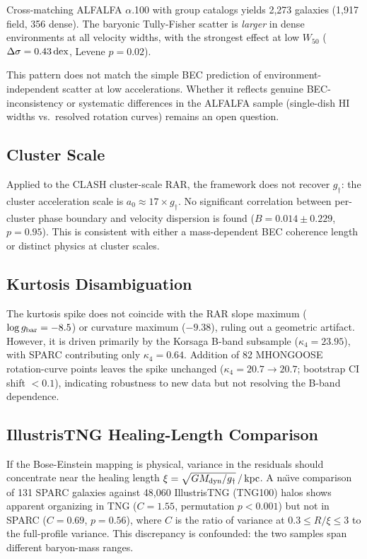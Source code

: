 \documentclass[twocolumn,twocolappendix]{aastex631}
\newcommand{\gbar}{g_{\rm bar}}
\newcommand{\gdag}{g_{\dagger}}
\newcommand{\dex}{\,{\rm dex}}
\begin{document}
Cross-matching ALFALFA $\alpha$.100 with \citet{Yang2007} group catalogs
yields 2{,}273 galaxies (1{,}917 field, 356 dense). The baryonic
Tully-Fisher scatter is \emph{larger} in dense environments at all velocity
widths, with the strongest effect at low $W_{50}$
($\Delta\sigma = 0.43\dex$, Levene $p = 0.02$).

This pattern does not match the simple BEC prediction of
environment-independent scatter at low accelerations. Whether it reflects
genuine BEC-inconsistency or systematic differences in the ALFALFA sample
(single-dish HI widths vs.\ resolved rotation curves) remains an open
question.

\subsection{Cluster Scale} \label{sec:clusters}

Applied to the \citet{Tian2020} CLASH cluster-scale RAR, the framework does
not recover $\gdag$: the cluster acceleration scale is
$a_0 \approx 17 \times \gdag$. No significant correlation between
per-cluster phase boundary and velocity dispersion is found
($B = 0.014 \pm 0.229$, $p = 0.95$). This is consistent with either a
mass-dependent BEC coherence length or distinct physics at cluster scales.

\subsection{Kurtosis Disambiguation} \label{sec:kurtosis_disambig}

The kurtosis spike does not coincide with the RAR slope maximum
($\log\gbar = -8.5$) or curvature maximum ($-9.38$), ruling out a
geometric artifact. However, it is driven primarily by the Korsaga B-band
subsample ($\kappa_4 = 23.95$), with SPARC contributing only
$\kappa_4 = 0.64$. Addition of 82 MHONGOOSE rotation-curve points leaves
the spike unchanged ($\kappa_4 = 20.7 \to 20.7$; bootstrap CI shift
$< 0.1$), indicating robustness to new data but not resolving the B-band
dependence.

\subsection{IllustrisTNG Healing-Length Comparison} \label{sec:tng_xi}

If the Bose-Einstein mapping is physical, variance in the residuals should
concentrate near the healing length $\xi = \sqrt{G M_{\rm dyn}/\gdag}\,/\,
{\rm kpc}$. A na\"{\i}ve comparison of 131 SPARC galaxies against 48{,}060
IllustrisTNG (TNG100) halos shows apparent organizing in TNG
($C = 1.55$, permutation $p < 0.001$) but not in SPARC
($C = 0.69$, $p = 0.56$), where $C$ is the ratio of variance at
$0.3 \leq R/\xi \leq 3$ to the full-profile variance. This discrepancy
is confounded: the two samples span different baryon-mass ranges.
\end{document}
